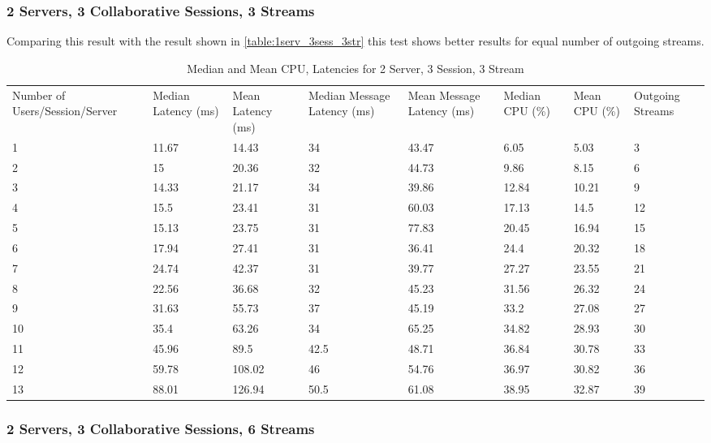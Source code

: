 \clearpage\subsubsection{2 Servers, 3 Collaborative Sessions, 3 Streams}

Comparing this result with the result shown in \ref{table:1serv_3sess_3str} this test shows better results for equal number of outgoing streams.

\begin{table}
\caption{Median and Mean CPU, Latencies for 2 Server, 3 Session, 3 Stream}
\label{table:2serv_3sess_3str}
\begin{tabu} to\linewidth{|X[c]|X[c]|X[c]|X[c]|X[c]|X[c]|X[c]|X[c]|}
\everyrow{\hline}
\hline
Number of Users/Session/Server & Median Latency (ms) & Mean Latency (ms) & Median Message Latency (ms) & Mean Message Latency (ms) & Median CPU (\%) & Mean CPU (\%) & Outgoing Streams\\
1 & 11.67 & 14.43 & 34 & 43.47 & 6.05 & 5.03 & 3 \\
2 & 15 & 20.36 & 32 & 44.73 & 9.86 & 8.15 & 6 \\
3 & 14.33 & 21.17 & 34 & 39.86 & 12.84 & 10.21 & 9 \\
4 & 15.5 & 23.41 & 31 & 60.03 & 17.13 & 14.5 & 12 \\
5 & 15.13 & 23.75 & 31 & 77.83 & 20.45 & 16.94 & 15 \\
6 & 17.94 & 27.41 & 31 & 36.41 & 24.4 & 20.32 & 18 \\
7 & 24.74 & 42.37 & 31 & 39.77 & 27.27 & 23.55 & 21 \\
8 & 22.56 & 36.68 & 32 & 45.23 & 31.56 & 26.32 & 24 \\
9 & 31.63 & 55.73 & 37 & 45.19 & 33.2 & 27.08 & 27 \\
10 & 35.4 & 63.26 & 34 & 65.25 & 34.82 & 28.93 & 30 \\
11 & 45.96 & 89.5 & 42.5 & 48.71 & 36.84 & 30.78 & 33 \\
12 & 59.78 & 108.02 & 46 & 54.76 & 36.97 & 30.82 & 36 \\
13 & 88.01 & 126.94 & 50.5 & 61.08 & 38.95 & 32.87 & 39 \\
\end{tabu}
\end{table}

\clearpage\subsubsection{2 Servers, 3 Collaborative Sessions, 6 Streams}

